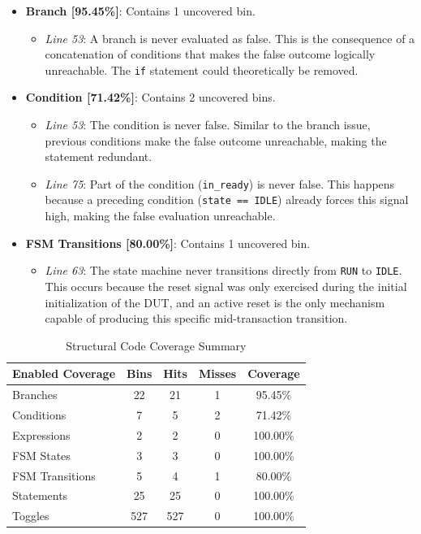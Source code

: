 \begin{itemize}
    \item \textbf{Branch [95.45\%]}: Contains 1 uncovered bin.
    \begin{itemize}
        \item \textit{Line 53}: A branch is never evaluated as false.
        This is the consequence of a concatenation of conditions that makes the false outcome logically unreachable.
        The \texttt{if} statement could theoretically be removed.
    \end{itemize}
    
    \item \textbf{Condition [71.42\%]}: Contains 2 uncovered bins.
    \begin{itemize}
        \item \textit{Line 53}: The condition is never false.
        Similar to the branch issue, previous conditions make the false outcome unreachable, making the statement redundant.
        \item \textit{Line 75}: Part of the condition (\texttt{in\_ready}) is never false.
        This happens because a preceding condition (\texttt{state == IDLE}) already forces this signal high, making the false evaluation unreachable.
    \end{itemize}
    
    \item \textbf{FSM Transitions [80.00\%]}: Contains 1 uncovered bin.
    \begin{itemize}
        \item \textit{Line 63}: The state machine never transitions directly from \texttt{RUN} to \texttt{IDLE}.
        This occurs because the reset signal was only exercised during the initial initialization of the DUT, and an active reset is the only mechanism capable of producing this specific mid-transaction transition.
    \end{itemize}
\end{itemize}

\begin{table}[H]
    \centering
    \begin{tabular}{|l|c|c|c|c|}
        \toprule
        \textbf{Enabled Coverage} & \textbf{Bins} & \textbf{Hits} & \textbf{Misses} & \textbf{Coverage} \\ \midrule
        Branches        & 22  & 21  & 1 & 95.45\%  \\ 
        Conditions      & 7   & 5   & 2 & 71.42\%  \\ 
        Expressions     & 2   & 2   & 0 & 100.00\% \\ 
        FSM States      & 3   & 3   & 0 & 100.00\% \\ 
        FSM Transitions & 5   & 4   & 1 & 80.00\%  \\ 
        Statements      & 25  & 25  & 0 & 100.00\% \\ 
        Toggles         & 527 & 527 & 0 & 100.00\% \\ \bottomrule
    \end{tabular}
    \caption{Structural Code Coverage Summary}
    \label{tab:code_coverage}
\end{table}

